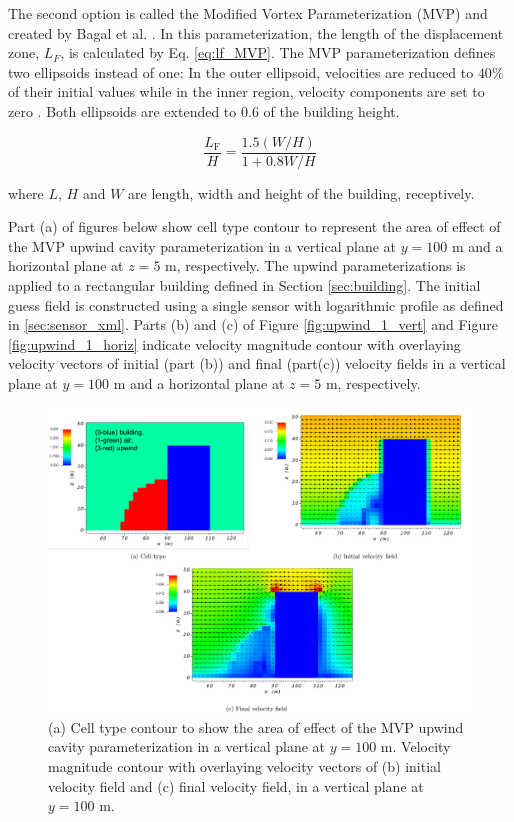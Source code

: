 The second option is called the Modified Vortex Parameterization (MVP) and created by Bagal et al. \cite{bagal2004improved}. In this parameterization, the length of the displacement zone, $L_F$, is calculated by Eq. \ref{eq:lf_MVP}. The MVP parameterization defines two ellipsoids instead of one: In the outer ellipsoid,  velocities are reduced to $40\%$ of their initial values while in the inner region, velocity components are set to zero \cite{nelson20085}. Both ellipsoids are extended to $0.6$ of the building height.

\begin{equation}
\frac{L_{\mathrm{F}}}{H}=\frac{1.5(W / H)}{1+0.8 W / H}
\label{eq:lf_MVP}
\end{equation}

where $L$, $H$ and $W$ are length, width and height of the building, receptively.

Part (a) of figures below show cell type contour to represent the area of effect of the MVP upwind cavity parameterization in a vertical plane at $y=100$ m and a horizontal plane at $z=5$ m, respectively. The upwind parameterizations is applied to a rectangular building defined in Section \ref{sec:building}. The initial guess field is constructed using a single sensor with logarithmic profile as defined in \ref{sec:sensor_xml}. Parts (b) and (c) of Figure \ref{fig:upwind_1_vert} and Figure \ref{fig:upwind_1_horiz} indicate velocity magnitude contour with overlaying velocity vectors of initial (part (b)) and final (part(c)) velocity fields in a vertical plane at $y=100$ m and a horizontal plane at $z=5$ m, respectively.

\begin{figure}[H]
    \centering
    \includegraphics[width=\textwidth]{Images/upwind_y_100_2.pdf}
    \caption{(a) Cell type contour to show the area of effect of the MVP upwind cavity parameterization in a vertical plane at $y=100$ m. Velocity magnitude contour with overlaying velocity vectors of (b) initial velocity field and (c) final velocity field, in a vertical plane at $y=100$ m.}
\end{figure}

